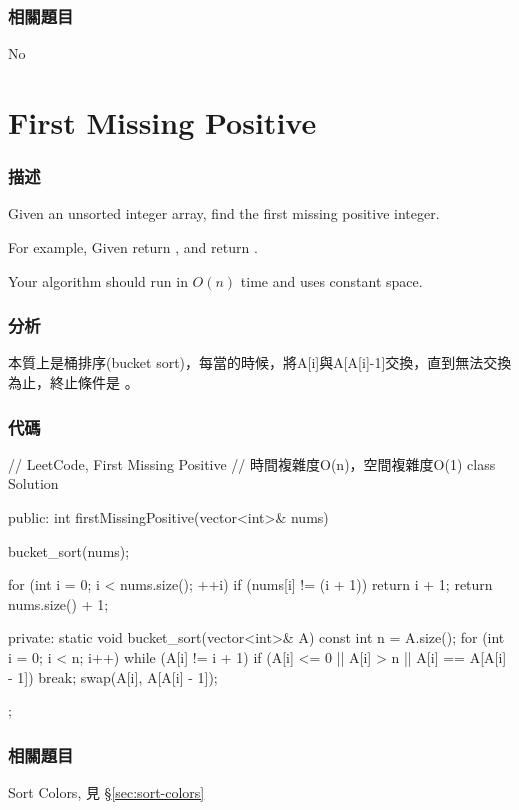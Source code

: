 \subsubsection{相關題目}
No
\newline

\section{First Missing Positive} %
\label{sec:first-missing-positive}


\subsubsection{描述}
Given an unsorted integer array, find the first missing positive integer.

For example,
Given \fn{[1,2,0]} return ,
and \fn{[3,4,-1,1]} return .

Your algorithm should run in $O(n)$ time and uses constant space.


\subsubsection{分析}
本質上是桶排序(bucket sort)，每當的時候，將A[i]與A[A[i]-1]交換，直到無法交換為止，終止條件是 。


\subsubsection{代碼}
\begin{Code}
// LeetCode, First Missing Positive
// 時間複雜度O(n)，空間複雜度O(1)
class Solution {
public:
    int firstMissingPositive(vector<int>& nums) {
        bucket_sort(nums);

        for (int i = 0; i < nums.size(); ++i)
            if (nums[i] != (i + 1))
                return i + 1;
        return nums.size() + 1;
    }
private:
    static void bucket_sort(vector<int>& A) {
        const int n = A.size();
        for (int i = 0; i < n; i++) {
            while (A[i] != i + 1) {
                if (A[i] <= 0 || A[i] > n || A[i] == A[A[i] - 1])
                    break;
                swap(A[i], A[A[i] - 1]);
            }
        }
    }
};
\end{Code}


\subsubsection{相關題目}
\begindot
\item Sort Colors, 見 \S \ref{sec:sort-colors}
\myenddot



